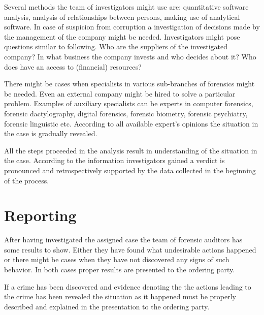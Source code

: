 Several methods the team of investigators might use are: quantitative software analysis, analysis of relationships between persons, making use of analytical software. In case of  suspicion from corruption a investigation of decisions made by the management of the company might be needed. Investigators might pose questions similar to following. Who are the suppliers of the investigated company? In what business the company invests and who decides about it? Who does have an access to (financial) resources?


There might be cases when specialists in various sub-branches of forensics might be needed. Even an external company might be hired to solve a particular problem. Examples of auxiliary specialists can be experts in computer forensics, forensic dactylography, digital forensics, forensic biometry, forensic psychiatry, forensic linguistic etc. According to all available expert's opinions the situation in the case is gradually revealed.

All the steps proceeded in the analysis result in understanding of the situation in the case. According to the information investigators gained a verdict is pronounced and retrospectively supported by the data collected in the beginning of the process. 

\section{Reporting}

After having investigated the assigned case the team of forensic auditors has some results to show. Either they have found what undesirable actions happened or there might be cases when they have not discovered any signs of such behavior. In both cases proper results are presented to the ordering party. 


If a crime has been discovered and evidence denoting the the actions leading to the crime has been revealed the situation as it happened must be properly described and explained in the presentation to the ordering party. 




